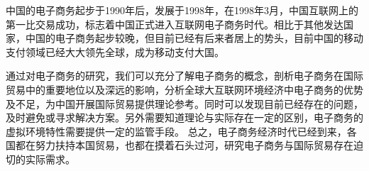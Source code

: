 中国的电子商务起步于1990年后，发展于1998年，在1998年3月，中国互联网上的第一比交易成功，标志着中国正式进入互联网电子商务时代。相比于其他发达国家，中国的电子商务起步较晚，但目前已经有后来者居上的势头，目前中国的移动支付领域已经大大领先全球，成为移动支付大国。

通过对电子商务的研究，我们可以充分了解电子商务的概念，剖析电子商务在国际贸易中的重要地位以及深远的影响，分析全球大互联网环境经济中电子商务的优势及不足，为中国开展国际贸易提供理论参考。同时可以发现目前已经存在的问题，及时避免或寻求解决方案。另外需要知道理论与实际存在一定的区别，电子商务的虚拟环境特性需要提供一定的监管手段。
总之，电子商务经济时代已经到来，各国都在努力扶持本国贸易，也都在摸着石头过河，研究电子商务与国际贸易存在迫切的实际需求。
%
%
